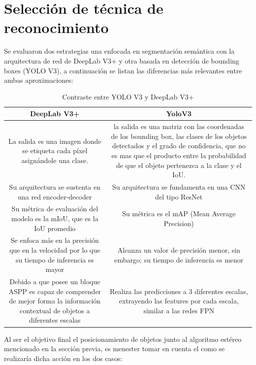 \section{Selección de técnica de reconocimiento}\label{tecnica_recog}
Se evaluaron dos estrategias una enfocada en segmentación semántica con la arquitectura de red de DeepLab V3+ y otra basada en detección de bounding boxes (YOLO V3), a continuación se listan las diferencias más relevantes entre ambas aproximaciones:
\begin{table}[H]
\renewcommand{\arraystretch}{1.5}
\centering
\caption{Contraste entre YOLO V3 y DeepLab V3+}
\label{deeplab_vs_yolo}
\begin{tabular}{|c|c|}
\hline
DeepLab V3+ & YoloV3 \\ \hline
\multicolumn{1}{|p{7cm}|}{La salida es una imagen donde se etiqueta cada píxel asignándole una clase.} & \multicolumn{1}{|p{7cm}|}{la salida es una matriz con las coordenadas de los bounding box, las clases de los objetos detectados y el grado de confidencia, que no es mas que el producto entre la probabilidad de que el objeto pertenezca a la clase y el IoU.} \\ \hline
\multicolumn{1}{|p{7cm}|}{Su arquitectura se sustenta en una red encoder-decoder} & \multicolumn{1}{|p{7cm}|}{Su arquitectura se fundamenta en una CNN del tipo ResNet} \\ \hline
\multicolumn{1}{|p{7cm}|}{Su métrica de evaluación del modelo es la mIoU, que es la IoU promedio} & \multicolumn{1}{|p{7cm}|}{Su métrica es el mAP (Mean Average Precision)} \\ \hline
\multicolumn{1}{|p{7cm}|}{Se enfoca más en la precisión que en la velocidad por lo que su tiempo de inferencia es mayor} & \multicolumn{1}{|p{7cm}|}{Alcanza un valor de precisión menor, sin embargo; su tiempo de inferencia es menor} \\ \hline
\multicolumn{1}{|p{7cm}|}{Debido a que posee un bloque ASPP es capaz de comprender de mejor forma la información contextual de objetos a diferentes escalas} & \multicolumn{1}{|p{7cm}|}{Realiza las predicciones a 3 diferentes escalas, extrayendo las features por cada escala, similar a las redes FPN \cite{FPN} }\\ \hline
\end{tabular}
\end{table}
Al ser el objetivo final el posicionamiento de objetos junto al algoritmo estéreo mencionado en la sección previa, es menester tomar en cuenta el como se realizaría dicha acción en los dos casos:
